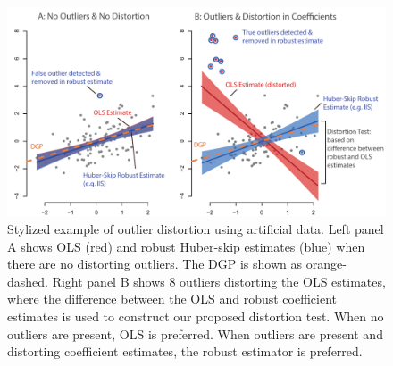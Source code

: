 \documentclass[11pt, letterpaper]{article}
\numberwithin{algorithm}{section}
\numberwithin{assumption}{section}
\numberwithin{lemma}{section}
\numberwithin{theorem}{section}
\numberwithin{corollary}{section}
\numberwithin{remark}{section}
\numberwithin{equation}{section}
\numberwithin{figure}{section}
\numberwithin{table}{section}
\begin{document}
\begin{figure}[!htbp]
\centering
\includegraphics[scale=0.7]{stylized_example_simple_paper_v2.pdf}
\caption{Stylized example of outlier distortion using artificial data. Left panel A shows OLS (red) and robust Huber-skip estimates (blue) when there are no distorting outliers. The DGP is shown as orange-dashed. Right panel B shows 8 outliers distorting the OLS estimates, where the difference between the OLS and robust coefficient estimates is used to construct our proposed distortion test. When no outliers are present, OLS is preferred. When outliers are present and distorting coefficient estimates, the robust estimator is preferred.}
\label{fig_out_styl}
\end{figure}
\end{document}

